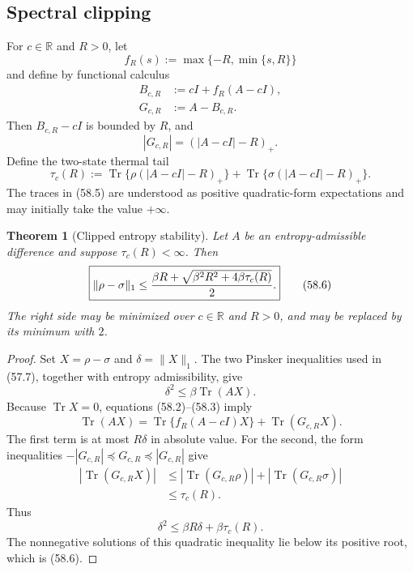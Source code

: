 \documentclass[11pt]{article}
\newtheorem{theorem}{Theorem}[section]
\theoremstyle{remark}
\begin{document}
\subsection{Spectral clipping}

For \(c\in\mathbb R\) and \(R>0\), let
\[
 f_R(s):=\max\{-R,\min\{s,R\}\}
\]
and define by functional calculus
\begin{align}
 B_{c,R}
 &:=
 cI+f_R(A-cI),                                    \tag{58.2}\\
 G_{c,R}
 &:=
 A-B_{c,R}.                                       \tag{58.3}
\end{align}
Then \(B_{c,R}-cI\) is bounded by \(R\), and
\begin{equation}
 |G_{c,R}|=(|A-cI|-R)_+.                          \tag{58.4}
\end{equation}
Define the two-state thermal tail
\begin{equation}
 \tau_c(R)
 :=
 \operatorname{Tr}\{\rho(|A-cI|-R)_+\}
 +
 \operatorname{Tr}\{\sigma(|A-cI|-R)_+\}.         \tag{58.5}
\end{equation}
The traces in (58.5) are understood as positive quadratic-form
expectations and may initially take the value \(+\infty\).

\begin{theorem}[Clipped entropy stability]
\label{thm:v12v58-clipped}
Let \(A\) be an entropy-admissible difference and suppose
\(\tau_c(R)<\infty\).  Then
\begin{equation}
 \boxed{
 \|\rho-\sigma\|_1
 \leq
 {\beta R+
 \sqrt{\beta^2R^2+4\beta\tau_c(R)}
 \over2}.}                                        \tag{58.6}
\end{equation}
The right side may be minimized over \(c\in\mathbb R\) and \(R>0\),
and may be replaced by its minimum with \(2\).
\end{theorem}

\begin{proof}
Set \(X=\rho-\sigma\) and
\(\delta=\|X\|_1\).  The two Pinsker inequalities used in (57.7),
together with entropy admissibility, give
\begin{equation}
 \delta^2\leq\beta\operatorname{Tr}(AX).           \tag{58.7}
\end{equation}
Because \(\operatorname{Tr}X=0\), equations (58.2)--(58.3) imply
\[
 \operatorname{Tr}(AX)
 =
 \operatorname{Tr}\{f_R(A-cI)X\}
 +
 \operatorname{Tr}(G_{c,R}X).
\]
The first term is at most \(R\delta\) in absolute value.  For the
second, the form inequalities
\(-|G_{c,R}|\preceq G_{c,R}\preceq|G_{c,R}|\) give
\begin{align}
 |\operatorname{Tr}(G_{c,R}X)|
 &\leq
 |\operatorname{Tr}(G_{c,R}\rho)|
 +
 |\operatorname{Tr}(G_{c,R}\sigma)|              \nonumber\\
 &\leq\tau_c(R).                                  \tag{58.8}
\end{align}
Thus
\begin{equation}
                         \delta^2
 \leq\beta R\delta+\beta\tau_c(R).                \tag{58.9}
\end{equation}
The nonnegative solutions of this quadratic inequality lie below
its positive root, which is (58.6).
\end{proof}
\end{document}
